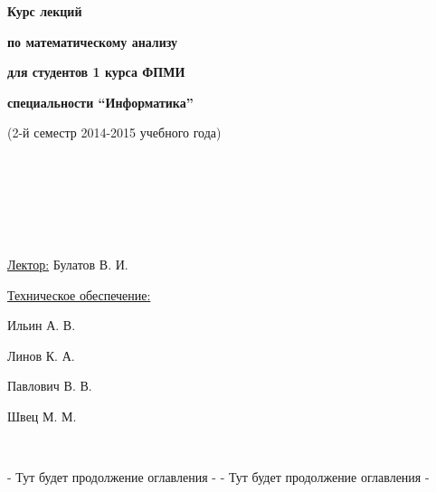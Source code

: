 \LARGE
\thispagestyle{empty}
$  $\newline\newline\newline\newline
\begin{center}
    \textbf{Курс лекций}
    
    \textbf{по математическому анализу}
    
    \textbf{для студентов 1 курса ФПМИ}
    
    \textbf{специальности ``Информатика''}
    
    (2-й семестр 2014-2015 учебного года)
\end{center}

$  $\\\\\\\\\\\\

\Large
\begin{flushright}
    \underline{Лектор:} Булатов В. И.
\end{flushright}

\begin{flushright}
    \underline{Техническое обеспечение:}
    
    Ильин А. В.
    
    Линов К. А.
    
    Павлович В. В.
    
    Швец М. М.
\end{flushright}

$  $\newpage
\thispagestyle{empty}
$  $\newpage


\titleformat{\section}{\LARGE\bfseries}{}{0pt}{}
\tableofcontents

\newpage
- Тут будет продолжение оглавления -\newpage
- Тут будет продолжение оглавления -\newpage
